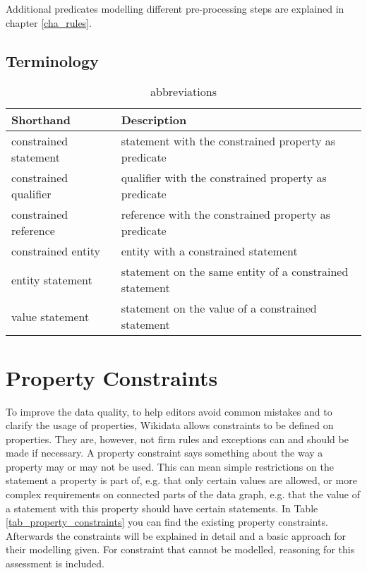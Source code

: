 \documentclass[hyperref,bachelorofscience,fleqn]{cgvpub}
\begin{document}
Additional predicates modelling different pre-processing steps are explained in chapter \ref{cha_rules}.
\section{Terminology}
\begin{table}[H]
\caption{abbreviations}\label{tab_abbreviations}
\begin{tabular}{ll}
Shorthand & Description \\
\hline
constrained statement & statement with the constrained property as predicate \\
constrained qualifier & qualifier with the constrained property as predicate \\
constrained reference & reference with the constrained property as predicate \\
constrained entity & entity with a constrained statement \\
entity statement & statement on the same entity of a constrained statement \\
value statement & statement on the value of a constrained statement
\end{tabular}
\end{table}
\chapter{Property Constraints}

To improve the data quality, to help editors avoid common mistakes and to clarify the usage of properties, Wikidata allows constraints to be defined on properties. They are, however, not firm rules and exceptions can and should be made if necessary. A property constraint says something about the way a property may or may not be used. This can mean simple restrictions on the statement a property is part of, e.g. that only certain values are allowed, or more complex requirements on connected parts of the data graph, e.g. that the value of a statement with this property should have certain statements. In Table \ref{tab_property_constraints} you can find the existing property constraints. Afterwards the constraints will be explained in detail and a basic approach for their modelling given. For constraint that cannot be modelled, reasoning for this assessment is included.
\end{document}
